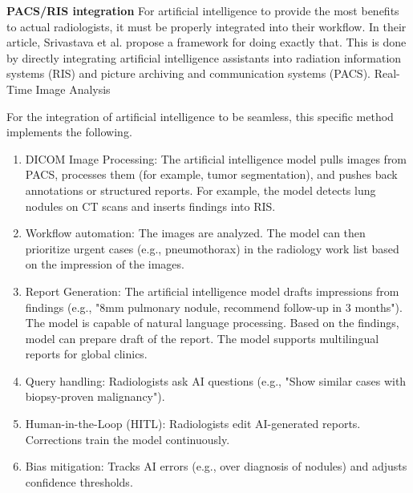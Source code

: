 \documentclass{IEEEcsmag}
\begin{document}
    \textbf{PACS/RIS integration} For artificial intelligence to provide the most benefits to actual radiologists, it must be properly integrated into their workflow.
    In their article, Srivastava et al.\cite{cite-6} propose a framework for doing exactly that.
    This is done by directly integrating artificial intelligence assistants into radiation information systems (RIS) and picture archiving and communication systems (PACS).
    Real-Time Image Analysis

    For the integration of artificial intelligence to be seamless, this specific method implements the following.
    \begin{enumerate}
        \item DICOM Image Processing: The artificial intelligence model pulls images from PACS, processes them (for example, tumor segmentation), and pushes back annotations or structured reports.
        For example, the model detects lung nodules on CT scans and inserts findings into RIS.
        \item Workflow automation: The images are analyzed.
        The model can then prioritize urgent cases (e.g., pneumothorax) in the radiology work list based on the impression of the images.
        \item Report Generation: The artificial intelligence model drafts impressions from findings (e.g., "8mm pulmonary nodule, recommend follow-up in 3 months").
        The model is capable of natural language processing.
        Based on the findings, model can prepare draft of the report.
        The model supports multilingual reports for global clinics.
        \item Query handling: Radiologists ask AI questions (e.g., "Show similar cases with biopsy-proven malignancy").
        \item Human-in-the-Loop (HITL): Radiologists edit AI-generated reports.
        Corrections train the model continuously.
        \item Bias mitigation: Tracks AI errors (e.g., over diagnosis of nodules) and adjusts confidence thresholds.
    \end{enumerate}
    
\end{document}
